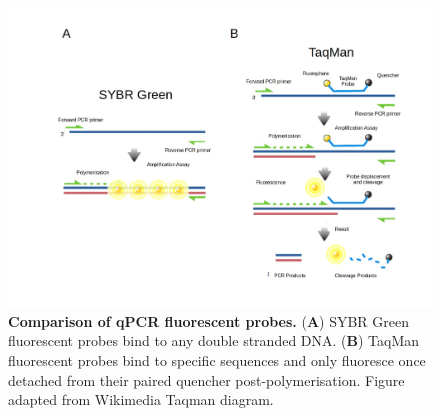 \documentclass[../main.tex]{subfiles}
\begin{document}
\begin{figure}[h]

{\centering \includegraphics[width=\linewidth]{figures/taqmanvssybrgreen} 

}

\caption[Comparison of qPCR fluorescent probes.]{\textbf{Comparison of qPCR fluorescent probes.} (\textbf{A}) SYBR Green fluorescent probes bind to any double stranded DNA. (\textbf{B}) TaqMan fluorescent probes bind to specific sequences and only fluoresce once detached from their paired quencher post-polymerisation. Figure adapted from Wikimedia Taqman diagram.}\label{fig:qpcr-fluo-tech}
\end{figure}

\end{document}
